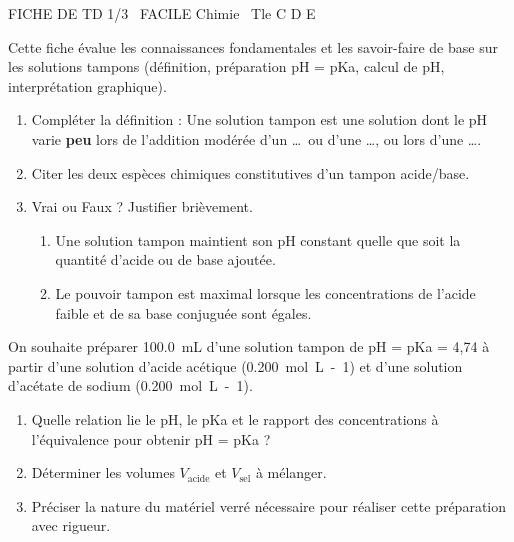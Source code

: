 \documentclass[11pt]{article}
\begin{document}
\begin{tcolorbox}[enhanced,colback=popink,colframe=popink,arc=10pt,boxrule=0pt,left=12pt,right=12pt,top=9pt,bottom=9pt]
{\color{white}\popxbold\small FICHE DE TD 1/3 \textbullet\ FACILE \hfill Chimie \textbullet\ Tle C D E\par}
\end{tcolorbox}
\vspace{4pt}
Cette fiche évalue les connaissances fondamentales et les savoir-faire de base sur les solutions tampons (définition, préparation pH = pKa, calcul de pH, interprétation graphique).

\begin{exercice}
\begin{enumerate}
    \item Compléter la définition : Une solution tampon est une solution dont le pH varie \textbf{peu} lors de l'addition modérée d'un \ldots\ ou d'une \ldots, ou lors d'une \ldots.
    \item Citer les deux espèces chimiques constitutives d'un tampon acide/base.
    \item Vrai ou Faux ? Justifier brièvement.
    \begin{enumerate}
        \item Une solution tampon maintient son pH constant quelle que soit la quantité d'acide ou de base ajoutée.
        \item Le pouvoir tampon est maximal lorsque les concentrations de l'acide faible et de sa base conjuguée sont égales.
    \end{enumerate}
\end{enumerate}
\end{exercice}

\begin{exercice}[Préparation d'un tampon de pH = pKa]
On souhaite préparer \SI{100,0}{mL} d'une solution tampon de pH = pKa = 4,74 à partir d'une solution d'acide acétique  (\SI{0,200}{mol.L-1}) et d'une solution d'acétate de sodium  (\SI{0,200}{mol.L-1}).
\begin{enumerate}
    \item Quelle relation lie le pH, le pKa et le rapport des concentrations à l'équivalence pour obtenir pH = pKa ?
    \item Déterminer les volumes $V_{\text{acide}}$ et $V_{\text{sel}}$ à mélanger.
    \item Préciser la nature du matériel verré nécessaire pour réaliser cette préparation avec rigueur.
\end{enumerate}
\end{exercice}
\end{document}
